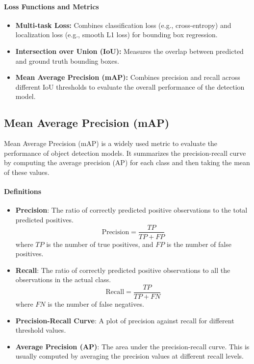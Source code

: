 \documentclass[12pt]{article}
\begin{document}
\paragraph{Loss Functions and Metrics}
\begin{itemize}
    \item \textbf{Multi-task Loss:} Combines classification loss (e.g., cross-entropy) and localization loss (e.g., smooth L1 loss) for bounding box regression.
    \item \textbf{Intersection over Union (IoU):} Measures the overlap between predicted and ground truth bounding boxes.
    \item \textbf{Mean Average Precision (mAP):} Combines precision and recall across different IoU thresholds to evaluate the overall performance of the detection model.
\end{itemize}

\subsection{Mean Average Precision (mAP)}

Mean Average Precision (mAP) is a widely used metric to evaluate the performance of object detection models. It summarizes the precision-recall curve by computing the average precision (AP) for each class and then taking the mean of these values.

\paragraph{Definitions}

\begin{itemize}
  \item \textbf{Precision}: The ratio of correctly predicted positive observations to the total predicted positives.
  \[
  \text{Precision} = \frac{TP}{TP + FP}
  \]
  where $TP$ is the number of true positives, and $FP$ is the number of false positives.

  \item \textbf{Recall}: The ratio of correctly predicted positive observations to all the observations in the actual class.
  \[
  \text{Recall} = \frac{TP}{TP + FN}
  \]
  where $FN$ is the number of false negatives.

  \item \textbf{Precision-Recall Curve}: A plot of precision against recall for different threshold values.

  \item \textbf{Average Precision (AP)}: The area under the precision-recall curve. This is usually computed by averaging the precision values at different recall levels.
\end{itemize}
\end{document}
